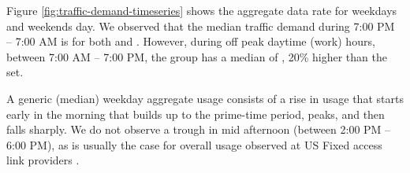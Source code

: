 Figure \ref{fig:traffic-demand-timeseries} shows the aggregate data rate for 
weekdays and weekends day. 
We observed that the median traffic demand during 7:00 PM -- 7:00 AM is 
 for both \treatment{} and \control{}. However, during off peak 
daytime (work) hours, between 7:00 AM -- 7:00 PM, the \treatment{} group has a 
median of , 20\% higher than the \control{} set.

 A generic (median) weekday aggregate usage consists of a rise in 
usage that starts early in the morning that builds up to the prime-time period, 
peaks, and then falls sharply. We do not observe a trough in mid afternoon 
(between 2:00 PM -- 6:00 PM), as is usually the case for overall usage observed 
at US Fixed access link providers \cite{sandvine20141h}.

